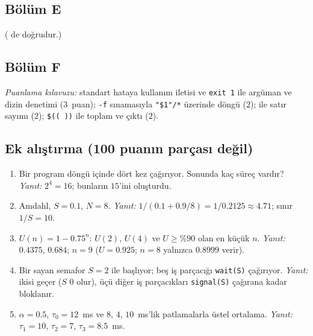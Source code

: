 \subsection*{Bölüm E}

( de doğrudur.)



\subsection*{Bölüm F}


\textit{Puanlama kılavuzu:} standart hataya kullanım iletisi ve \texttt{exit 1} ile argüman ve dizin denetimi ($3$~puan); \texttt{-f} sınamasıyla \texttt{"\$1"/*} üzerinde döngü ($2$);  ile satır sayımı ($2$); \texttt{\$(( ))} ile toplam ve çıktı ($2$).

\subsection*{Ek alıştırma (100 puanın parçası değil)}
\begin{enumerate}[leftmargin=1.6em]
  \item Bir program döngü içinde dört kez  çağırıyor. Sonunda kaç süreç vardır? \emph{Yanıt:} $2^{4} = 16$; bunların $15$'ini  oluşturdu.
  \item Amdahl, $S = 0.1$, $N = 8$. \emph{Yanıt:} $1/(0.1 + 0.9/8) = 1/0.2125 \approx 4.71$; sınır $1/S = 10$.
  \item $U(n) = 1 - 0.75^{n}$: $U(2)$, $U(4)$ ve $U \ge \%90$ olan en küçük $n$. \emph{Yanıt:} $0.4375$, $0.684$; $n = 9$ ($U = 0.925$; $n = 8$ yalnızca $0.8999$ verir).
  \item Bir sayan semafor $S = 2$ ile başlıyor; beş iş parçacığı \texttt{wait(S)} çağırıyor. \emph{Yanıt:} ikisi geçer ($S$ $0$ olur), üçü diğer iş parçacıkları \texttt{signal(S)} çağırana kadar bloklanır.
  \item $\alpha = 0.5$, $\tau_0 = 12$~ms ve $8$, $4$, $10$~ms'lik patlamalarla üstel ortalama. \emph{Yanıt:} $\tau_1 = 10$, $\tau_2 = 7$, $\tau_3 = 8.5$~ms.
\end{enumerate}

